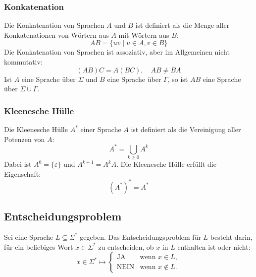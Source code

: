 \subsubsection{Konkatenation}
Die Konkatenation von Sprachen \(A\) und \(B\) ist definiert als die Menge aller Konkatenationen von Wörtern aus \(A\) mit Wörtern aus \(B\):
\[
    AB = \{ uv \mid u \in A, v \in B \}
\]
Die Konkatenation von Sprachen ist assoziativ, aber im Allgemeinen nicht kommutativ:
\[
    (AB)C = A(BC), \quad AB \neq BA
\]
Ist \(A\) eine Sprache über \(\Sigma\) und \(B\) eine Sprache über \(\Gamma\), so ist \(AB\) eine Sprache über \(\Sigma \cup \Gamma\).

\subsubsection{Kleenesche Hülle}
Die Kleenesche Hülle \(A^*\) einer Sprache \(A\) ist definiert als die Vereinigung aller Potenzen von \(A\):
\[
    A^* = \bigcup_{k \ge 0} A^k
\]
Dabei ist \(A^0 = \{\varepsilon\}\) und \(A^{k+1} = A^k A\).
Die Kleenesche Hülle erfüllt die Eigenschaft:
\[
    (A^*)^* = A^*
\]


\subsection{Entscheidungsproblem}
Sei eine Sprache \(L \subseteq \Sigma^*\) gegeben. Das Entscheidungsproblem für \(L\) besteht darin, für ein beliebiges Wort \(x \in \Sigma^*\) zu entscheiden, ob \(x\) in \(L\) enthalten ist oder nicht:
\[
    x \in \Sigma^* \mapsto
    \begin{cases}
        \text{JA} & \text{wenn } x \in L, \\
        \text{NEIN} & \text{wenn } x \notin L.
    \end{cases}
\]
